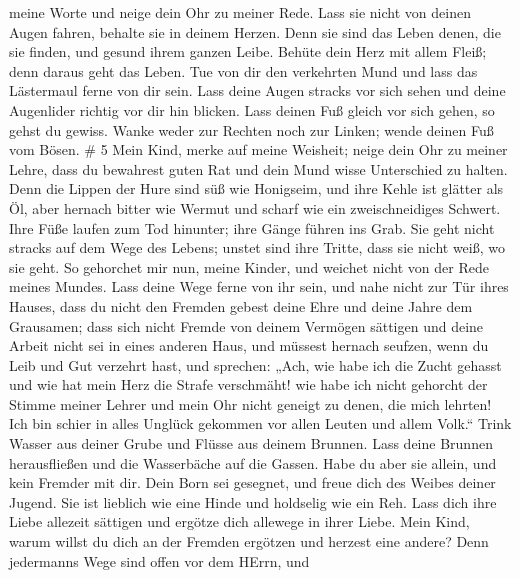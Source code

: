 meine Worte und neige dein Ohr zu meiner Rede.  Lass sie
nicht von deinen Augen fahren, behalte sie in deinem Herzen.
 Denn sie sind das Leben denen, die sie finden, und gesund
ihrem ganzen Leibe.  Behüte dein Herz mit allem Fleiß; denn
daraus geht das Leben.  Tue von dir den verkehrten Mund und
lass das Lästermaul ferne von dir sein.  Lass deine Augen
stracks vor sich sehen und deine Augenlider richtig vor dir hin blicken.
 Lass deinen Fuß gleich vor sich gehen, so gehst du gewiss.
 Wanke weder zur Rechten noch zur Linken; wende deinen Fuß
vom Bösen. \# 5  Mein Kind, merke auf meine Weisheit; neige
dein Ohr zu meiner Lehre,  dass du bewahrest guten Rat und
dein Mund wisse Unterschied zu halten.  Denn die Lippen der
Hure sind süß wie Honigseim, und ihre Kehle ist glätter als Öl,
 aber hernach bitter wie Wermut und scharf wie ein
zweischneidiges Schwert.  Ihre Füße laufen zum Tod hinunter;
ihre Gänge führen ins Grab.  Sie geht nicht stracks auf dem
Wege des Lebens; unstet sind ihre Tritte, dass sie nicht weiß, wo sie
geht.  So gehorchet mir nun, meine Kinder, und weichet nicht
von der Rede meines Mundes.  Lass deine Wege ferne von ihr
sein, und nahe nicht zur Tür ihres Hauses,  dass du nicht
den Fremden gebest deine Ehre und deine Jahre dem Grausamen;
 dass sich nicht Fremde von deinem Vermögen sättigen und
deine Arbeit nicht sei in eines anderen Haus,  und müssest
hernach seufzen, wenn du Leib und Gut verzehrt hast,  und
sprechen: „Ach, wie habe ich die Zucht gehasst und wie hat mein Herz die
Strafe verschmäht!  wie habe ich nicht gehorcht der Stimme
meiner Lehrer und mein Ohr nicht geneigt zu denen, die mich lehrten!
 Ich bin schier in alles Unglück gekommen vor allen Leuten
und allem Volk.``  Trink Wasser aus deiner Grube und Flüsse
aus deinem Brunnen.  Lass deine Brunnen herausfließen und
die Wasserbäche auf die Gassen.  Habe du aber sie allein,
und kein Fremder mit dir.  Dein Born sei gesegnet, und
freue dich des Weibes deiner Jugend.  Sie ist lieblich wie
eine Hinde und holdselig wie ein Reh. Lass dich ihre Liebe allezeit
sättigen und ergötze dich allewege in ihrer Liebe.  Mein
Kind, warum willst du dich an der Fremden ergötzen und herzest eine
andere?  Denn jedermanns Wege sind offen vor dem HErrn, und

